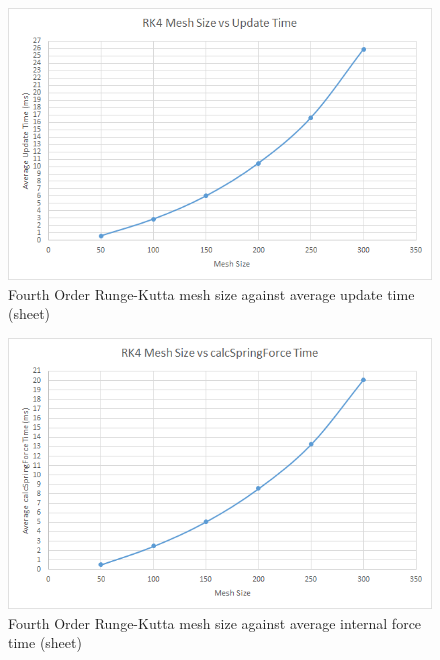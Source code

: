     \begin{figure}
    \begin{center}
      \includegraphics[scale=.9]{Figures/sheet_rk4_m_ut}
    \end{center}
    \caption{Fourth Order Runge-Kutta mesh size against average update time (sheet)}
    \label{fig:rk4 mesh update sheet}
  \end{figure}
  
    \begin{figure}
    \begin{center}
      \includegraphics[scale=.9]{Figures/sheet_rk4_m_csf}
    \end{center}
    \caption{Fourth Order Runge-Kutta mesh size against average internal force time (sheet)}
    \label{fig:rk4 mesh csf sheet}
  \end{figure}
  
